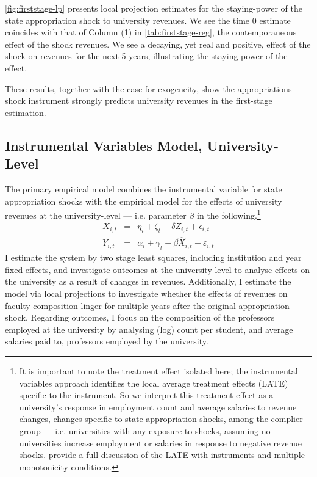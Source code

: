 \documentclass[notitlepage,12pt]{article}
\begin{document}
\autoref{fig:firststage-lp} presents local projection estimates for the staying-power of the state appropriation shock to university revenues.
We see the time 0 estimate coincides with that of Column (1) in \autoref{tab:firststage-reg}, the contemporaneous effect of the shock revenues.
We see a decaying, yet real and positive, effect of the shock on revenues for the next 5 years, illustrating the staying power of the effect.

These results, together with the case for exogeneity, show the appropriations shock instrument strongly predicts university revenues in the first-stage estimation.


\subsection{Instrumental Variables Model, University-Level}
\label{sec:iv-model-uni}

The primary empirical model combines the instrumental variable for state appropriation shocks with the empirical model for the effects of university revenues at the university-level --- i.e. parameter $\beta$ in the following.\footnote{
    It is important to note the treatment effect isolated here; the instrumental variables approach identifies the local average treatment effects (LATE) specific to the instrument.
    So we interpret this treatment effect as a university's response in employment count and average salaries to revenue changes, changes specific to state appropriation shocks, among the complier group --- i.e. universities with any exposure to shocks, assuming no universities increase employment or salaries in response to negative revenue shocks.
    \cite{mogstad2021causal} provide a full discussion of the LATE with instruments and multiple monotonicity conditions.
}
\begin{eqnarray}
    \label{eqn:secondstage1}
    X_{i,t} &=& \eta_i + \zeta_t + \delta Z_{i,t} + \epsilon_{i,t} \\
    \label{eqn:secondstage2}
    Y_{i,t} &=& \alpha_i + \gamma_t + \beta \widehat X_{i,t} + \varepsilon_{i,t}
\end{eqnarray}
I estimate the system by two stage least squares, including institution and year fixed effects, and investigate outcomes at the university-level to analyse effects on the university as a result of changes in revenues.
Additionally, I estimate the model via local projections \citep{jorda2005,miller2022} to investigate whether the effects of revenues on faculty composition linger for multiple years after the original appropriation shock.
Regarding outcomes, I focus on the composition of the professors employed at the university by analysing (log) count per student, and average salaries paid to, professors employed by the university.
\end{document}
